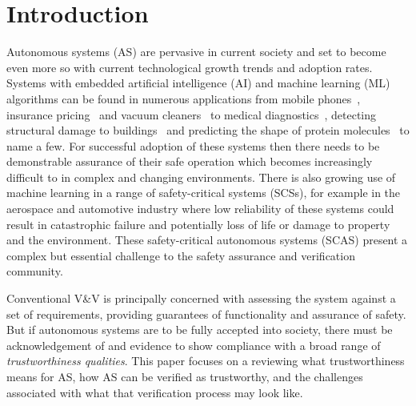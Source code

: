 % 


\section{Introduction}
Autonomous systems (AS) are pervasive in current society and set to become even more so with current technological growth trends and adoption rates. Systems with embedded artificial intelligence (AI) and machine learning (ML) algorithms can be found in numerous applications from mobile phones~\cite{medium_ai_phones}, insurance pricing~\cite{kuo2020towards} and vacuum cleaners~\cite{tf_vacuum} to medical diagnostics~\cite{kononenko2001machine}, detecting structural damage to buildings~\cite{avci2021review} and predicting the shape of protein molecules~\cite{alpha_fold} to name a few.
%
For successful adoption of these systems then there needs to be demonstrable assurance of their safe operation which becomes increasingly difficult to in complex and changing environments.  
%
There is also growing use of machine learning in a range of safety-critical systems (SCSs), for example in the aerospace and automotive industry where low reliability of these systems could result in catastrophic failure and potentially loss of life or damage to property and the environment. These safety-critical autonomous systems (SCAS) present a complex but essential challenge to the safety assurance and verification community. 

%
Conventional V\&V is principally concerned with assessing the system against a set of requirements, providing guarantees of functionality and assurance of safety. But if autonomous systems are to be fully accepted into society, there must be acknowledgement of and evidence to show compliance with a broad range of \emph{trustworthiness qualities}. 
%
This paper focuses on a reviewing what trustworthiness means for AS, how AS can be verified as trustworthy, and the challenges associated with what that verification process may look like. 

